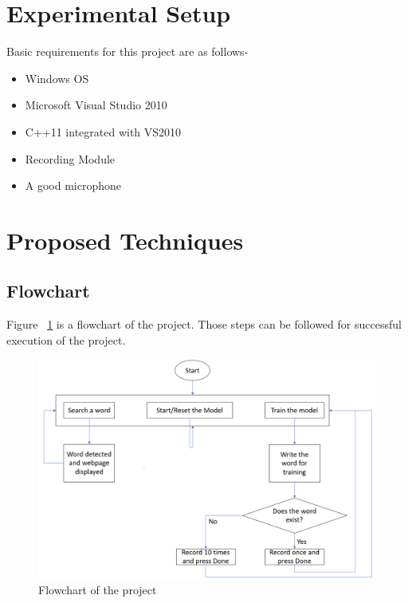 \documentclass{article}
\begin{document}
\section{Experimental Setup}
Basic requirements for this project are as follows-\\
\begin{itemize}
\item Windows OS
\item Microsoft Visual Studio 2010
\item C++11 integrated with VS2010
\item Recording Module
\item A good microphone
\end{itemize}
\section{Proposed Techniques}
\subsection{Flowchart}
Figure ~\ref{fig:fc} is a flowchart of the project. Those steps can be followed for successful execution of the project.
\begin{figure}
\includegraphics[scale=0.6]{flowchart.png}
\caption{Flowchart of the project}
\label{fig:fc}
\end{figure}
\end{document}
